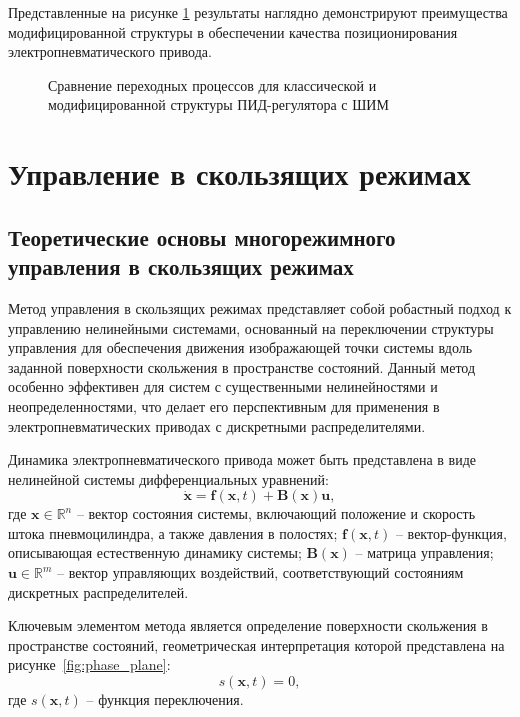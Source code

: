 Представленные на рисунке \ref{fig:ch3:transient_comparison} результаты наглядно демонстрируют
преимущества модифицированной структуры в обеспечении качества позиционирования электропневматического привода.

\begin{figure}[ht]
	\caption{Сравнение переходных процессов для классической и модифицированной структуры ПИД-регулятора с ШИМ}
	\label{fig:ch3:transient_comparison}
\end{figure}


\section{Управление в скользящих режимах}\label{sec:ch3/sec3}

\subsection{Теоретические основы многорежимного управления в скользящих режимах}\label{subsec:ch3/sec3/sub1}

Метод управления в скользящих режимах представляет собой робастный подход к управлению нелинейными системами,
основанный на переключении структуры управления для обеспечения движения изображающей точки системы вдоль заданной поверхности скольжения в
пространстве состояний. Данный метод особенно эффективен для систем с существенными нелинейностями и неопределенностями, что делает его
перспективным для применения в электропневматических приводах с дискретными распределителями.

Динамика электропневматического привода может быть представлена в виде нелинейной системы дифференциальных уравнений:
\begin{equation*}
	\dot{\mathbf{x}} = \mathbf{f}(\mathbf{x}, t) + \mathbf{B}(\mathbf{x})\mathbf{u},
\end{equation*}
где $\mathbf{x} \in \mathbb{R}^n$ -- вектор состояния системы, включающий положение и скорость штока пневмоцилиндра, а также давления в полостях;
$\mathbf{f}(\mathbf{x}, t)$ -- вектор-функция, описывающая естественную динамику системы;
$\mathbf{B}(\mathbf{x})$ -- матрица управления; $\mathbf{u} \in \mathbb{R}^m$ -- вектор управляющих воздействий, соответствующий состояниям дискретных распределителей.

Ключевым элементом метода является определение поверхности скольжения в пространстве состояний, геометрическая интерпретация которой представлена на рисунке~\ref{fig:phase_plane}:
\begin{equation*}
	s(\mathbf{x}, t) = 0,
\end{equation*}
где $s(\mathbf{x}, t)$ -- функция переключения.

